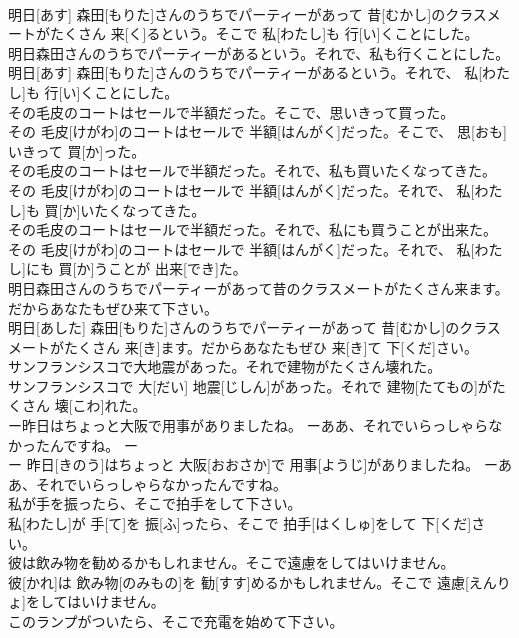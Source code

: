\documentclass[8pt]{extreport}
\begin{document}
\begin{CJK}{UTF8}{min}
\\	明日[あす] 森田[もりた]さんのうちでパーティーがあって 昔[むかし]のクラスメートがたくさん 来[く]るという。そこで 私[わたし]も 行[い]くことにした。
\\	明日森田さんのうちでパーティーがあるという。それで、私も行くことにした。	
\\	明日[あす] 森田[もりた]さんのうちでパーティーがあるという。それで、 私[わたし]も 行[い]くことにした。
\\	その毛皮のコートはセールで半額だった。そこで、思いきって買った。	
\\	その 毛皮[けがわ]のコートはセールで 半額[はんがく]だった。そこで、 思[おも]いきって 買[か]った。
\\	その毛皮のコートはセールで半額だった。それで、私も買いたくなってきた。	
\\	その 毛皮[けがわ]のコートはセールで 半額[はんがく]だった。それで、 私[わたし]も 買[か]いたくなってきた。
\\	その毛皮のコートはセールで半額だった。それで、私にも買うことが出来た。	
\\	その 毛皮[けがわ]のコートはセールで 半額[はんがく]だった。それで、 私[わたし]にも 買[か]うことが 出来[でき]た。
\\	明日森田さんのうちでパーティーがあって昔のクラスメートがたくさん来ます。だからあなたもぜひ来て下さい。	
\\	明日[あした] 森田[もりた]さんのうちでパーティーがあって 昔[むかし]のクラスメートがたくさん 来[き]ます。だからあなたもぜひ 来[き]て 下[くだ]さい。
\\	サンフランシスコで大地震があった。それで建物がたくさん壊れた。	
\\	サンフランシスコで 大[だい] 地震[じしん]があった。それで 建物[たてもの]がたくさん 壊[こわ]れた。
\\	ー昨日はちょっと大阪で用事がありましたね。 ーああ、それでいらっしゃらなかったんですね。	ー
\\	ー 昨日[きのう]はちょっと 大阪[おおさか]で 用事[ようじ]がありましたね。 ーああ、それでいらっしゃらなかったんですね。
\\	私が手を振ったら、そこで拍手をして下さい。	
\\	私[わたし]が 手[て]を 振[ふ]ったら、そこで 拍手[はくしゅ]をして 下[くだ]さい。
\\	彼は飲み物を勧めるかもしれません。そこで遠慮をしてはいけません。	
\\	彼[かれ]は 飲み物[のみもの]を 勧[すす]めるかもしれません。そこで 遠慮[えんりょ]をしてはいけません。
\\	このランプがついたら、そこで充電を始めて下さい。	

\end{CJK}
\end{document}
